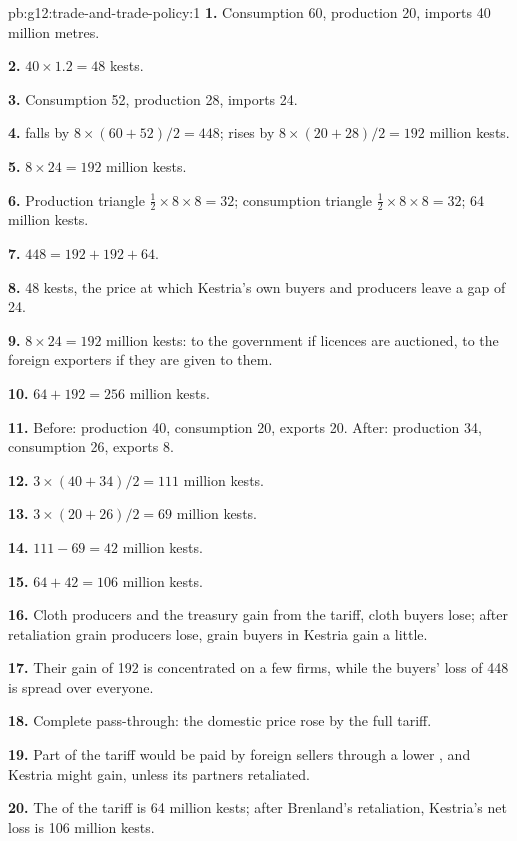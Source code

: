 \begin{solution}{pb:g12:trade-and-trade-policy:1}
\textbf{1.} Consumption 60, production 20, imports 40 million metres.

\textbf{2.} $40 \times 1.2 = 48$ kests.

\textbf{3.} Consumption 52, production 28, imports 24.

\textbf{4.}  falls by $8 \times (60 + 52)/2 = 448$;  rises by $8 \times (20 + 28)/2 = 192$ million kests.

\textbf{5.} $8 \times 24 = 192$ million kests.

\textbf{6.} Production triangle $\tfrac12 \times 8 \times 8 = 32$; consumption triangle $\tfrac12 \times 8 \times 8 = 32$;  64 million kests.

\textbf{7.} $448 = 192 + 192 + 64$.

\textbf{8.} 48 kests, the price at which Kestria's own buyers and producers leave a gap of 24.

\textbf{9.} $8 \times 24 = 192$ million kests: to the government if licences are auctioned, to the foreign exporters if they are given to them.

\textbf{10.} $64 + 192 = 256$ million kests.

\textbf{11.} Before: production 40, consumption 20, exports 20. After: production 34, consumption 26, exports 8.

\textbf{12.} $3 \times (40 + 34)/2 = 111$ million kests.

\textbf{13.} $3 \times (20 + 26)/2 = 69$ million kests.

\textbf{14.} $111 - 69 = 42$ million kests.

\textbf{15.} $64 + 42 = 106$ million kests.

\textbf{16.} Cloth producers and the treasury gain from the tariff, cloth buyers lose; after retaliation grain producers lose, grain buyers in Kestria gain a little.

\textbf{17.} Their gain of 192 is concentrated on a few firms, while the buyers' loss of 448 is spread over everyone.

\textbf{18.} Complete pass-through: the domestic price rose by the full tariff.

\textbf{19.} Part of the tariff would be paid by foreign sellers through a lower , and Kestria might gain, unless its partners retaliated.

\textbf{20.} The  of the tariff is 64 million kests; after Brenland's retaliation, Kestria's net loss is 106 million kests.
\end{solution}
